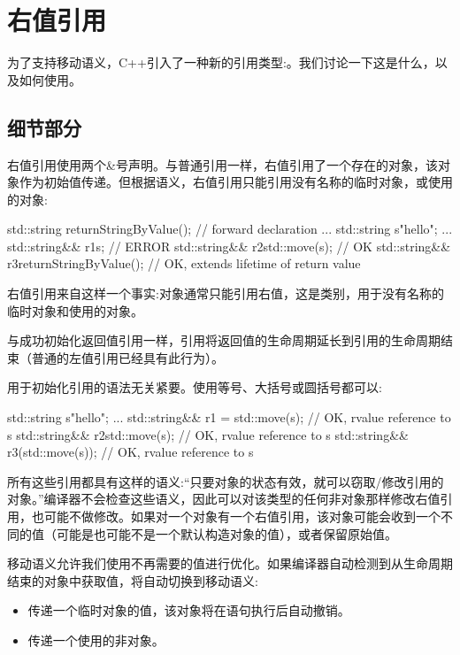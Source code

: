 \section{右值引用}

为了支持移动语义，C++引入了一种新的引用类型:。我们讨论一下这是什么，以及如何使用。

\subsection{细节部分}

右值引用使用两个\&号声明。与普通引用一样，右值引用了一个存在的对象，该对象作为初始值传递。但根据语义，右值引用只能引用没有名称的临时对象，或使用的对象:

\begin{cppcode}
std::string returnStringByValue(); // forward declaration
...
std::string s{"hello"};
...
std::string&& r1{s}; // ERROR
std::string&& r2{std::move(s)}; // OK
std::string&& r3{returnStringByValue()}; // OK, extends lifetime of return value
\end{cppcode}

右值引用来自这样一个事实:对象通常只能引用右值，这是类别，用于没有名称的临时对象和使用的对象。

与成功初始化返回值引用一样，引用将返回值的生命周期延长到引用的生命周期结束（普通的左值引用已经具有此行为）。

用于初始化引用的语法无关紧要。使用等号、大括号或圆括号都可以:

\begin{cppcode}
std::string s{"hello"};
...
std::string&& r1 = std::move(s); // OK, rvalue reference to s
std::string&& r2{std::move(s)}; // OK, rvalue reference to s
std::string&& r3(std::move(s)); // OK, rvalue reference to s
\end{cppcode}

所有这些引用都具有这样的语义:“只要对象的状态有效，就可以窃取/修改引用的对象。”编译器不会检查这些语义，因此可以对该类型的任何非对象那样修改右值引用，也可能不做修改。如果对一个对象有一个右值引用，该对象可能会收到一个不同的值（可能是也可能不是一个默认构造对象的值），或者保留原始值。

移动语义允许我们使用不再需要的值进行优化。如果编译器自动检测到从生命周期结束的对象中获取值，将自动切换到移动语义:

\begin{itemize}
	\item 传递一个临时对象的值，该对象将在语句执行后自动撤销。
	\item 传递一个使用的非对象。
\end{itemize}

